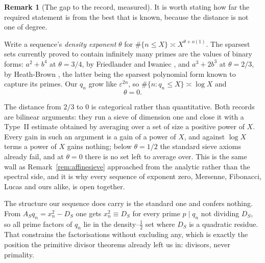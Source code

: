 \documentclass[11pt]{article}
\theoremstyle{definition}
\newtheorem{remark}[theorem]{Remark}
\begin{document}
\begin{remark}[The gap to the record, measured]\label{rem:sparserecord}
It is worth stating how far the required statement is from the best that is known, because the
distance is not one of degree.

Write a sequence's \emph{density exponent} $\theta$ for $\#\{n\le X\}\asymp X^{\theta+o(1)}$. The
sparsest sets currently proved to contain infinitely many primes are the values of binary forms:
$a^2+b^4$ at $\theta=3/4$, by Friedlander and Iwaniec \cite{FI1998}, and $a^3+2b^3$ at $\theta=2/3$,
by Heath-Brown \cite{HB2001}, the latter being the sparsest polynomial form known to capture its
primes. Our $q_n$ grow like $\varepsilon^{2n}$, so $\#\{n:q_n\le X\}\asymp\log X$ and
\[ \theta=0. \]

The distance from $2/3$ to $0$ is categorical rather than quantitative. Both records are bilinear
arguments: they run a sieve of dimension one and close it with a Type~II estimate obtained by
averaging over a set of size a positive power of $X$. Every gain in such an argument is a gain of a
power of $X$, and against $\log X$ terms a power of $X$ gains nothing; below $\theta=1/2$ the
standard sieve axioms already fail, and at $\theta=0$ there is no set left to average over. This is
the same wall as Remark~\ref{rem:affinesieve} approached from the analytic rather than the spectral
side, and it is why every sequence of exponent zero, Mersenne, Fibonacci, Lucas and ours alike, is
open together.

The structure our sequence does carry is the standard one and confers nothing. From
$A_Sq_n=x_n^2-D_S$ one gets $x_n^2\equiv D_S$ for every prime $p\mid q_n$ not dividing $D_S$, so all
prime factors of $q_n$ lie in the density--$\tfrac12$ set where $D_S$ is a quadratic residue. That
constrains the factorisations without excluding any, which is exactly the position the primitive
divisor theorems already left us in: divisors, never primality.
\end{remark}
\end{document}
